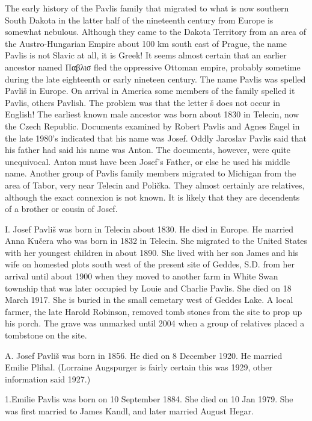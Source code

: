 \documentclass[a4paper]{article}
\begin{document}
	The early history of the Pavlis family that migrated to what is now southern South Dakota in the latter half of the nineteenth century from Europe is somewhat nebulous.  Although they came to the Dakota Territory from an area of the Austro-Hungarian Empire about 100 km south east of Prague, the name Pavlis is not Slavic at all, it is Greek!   It seems almost certain that an earlier ancestor named Παβλισ
 fled the oppressive Ottoman empire, probably sometime during the late eighteenth or early nineteen century.  
	The name Pavlis was spelled Pavliš in Europe.  On arrival in America some members of the family spelled it Pavlis, others Pavlish.  The problem was that the letter š does not occur in English!    
	The earliest known male ancestor was born about 1830 in Telecin, now the Czech Republic.  Documents examined by Robert Pavlis and Agnes Engel in the late 1980's indicated that his name was Josef.  Oddly Jaroslav Pavlis said that his father had said his name was Anton.  The documents, however,  were quite unequivocal.  Anton must have been Josef's Father, or else he used his middle name.  
	Another group of Pavlis family members migrated to Michigan from the area of Tabor, very near Telecin and Polička.  They almost certainly are relatives, although the exact connexion is not known.  It is likely that they are decendents of a brother or cousin of Josef. 

I. Josef Pavliš was born in Telecin about 1830.  He died in Europe.  He married Anna Kučera who was born in 1832 in Telecin.  She migrated to the United States with her youngest children in about 1890.  She lived with her son James and his wife on homested plots south west of the present site of Geddes, S.D.  from her arrival until about 1900 when they moved to another farm in White Swan township that was later occupied by Louie and Charlie Pavlis.  She died on 18 March 1917.  She is buried in the small cemetary west of Geddes Lake.  A local farmer, the late Harold Robinson, removed tomb stones from the site to prop up his porch.  The grave was unmarked until 2004 when a group of relatives placed a tombstone on the site.   
\vskip 6mm

A. Josef Pavliš was born in 1856.  He died on 8 December 1920.  He married Emilie Plihal. (Lorraine Augspurger is fairly certain this was 1929, other information said 1927.)

1.Emilie Pavlis was born on 10 September 1884.  She died on 10 Jan 1979.  She was first married to James Kandl, and later married August Hegar.
\end{document}
